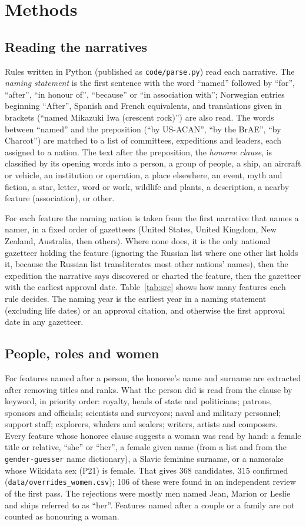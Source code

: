 \documentclass[11pt,a4paper]{article}
\begin{document}
\section{Methods}
\subsection{Reading the narratives}
Rules written in Python (published as \texttt{code/parse.py}) read each narrative. The \emph{naming statement} is the first sentence with the word ``named'' followed by ``for'', ``after'', ``in honour of'', ``because'' or ``in association with''; Norwegian entries beginning ``After'', Spanish and French equivalents, and translations given in brackets (``named Mikazuki Iwa (crescent rock)'') are also read. The words between ``named'' and the preposition (``by US-ACAN'', ``by the BrAE'', ``by Charcot'') are matched to a list of committees, expeditions and leaders, each assigned to a nation. The text after the preposition, the \emph{honoree clause}, is classified by its opening words into a person, a group of people, a ship, an aircraft or vehicle, an institution or operation, a place elsewhere, an event, myth and fiction, a star, letter, word or work, wildlife and plants, a description, a nearby feature (association), or other.

For each feature the naming nation is taken from the first narrative that names a namer, in a fixed order of gazetteers (United States, United Kingdom, New Zealand, Australia, then others). Where none does, it is the only national gazetteer holding the feature (ignoring the Russian list where one other list holds it, because the Russian list transliterates most other nations' names), then the expedition the narrative says discovered or charted the feature, then the gazetteer with the earliest approval date. Table~\ref{tab:src} shows how many features each rule decides. The naming year is the earliest year in a naming statement (excluding life dates) or an approval citation, and otherwise the first approval date in any gazetteer.

\subsection{People, roles and women}
For features named after a person, the honoree's name and surname are extracted after removing titles and ranks. What the person did is read from the clause by keyword, in priority order: royalty, heads of state and politicians; patrons, sponsors and officials; scientists and surveyors; naval and military personnel; support staff; explorers, whalers and sealers; writers, artists and composers. Every feature whose honoree clause suggests a woman was read by hand: a female title or relative, ``she'' or ``her'', a female given name (from a list and from the \texttt{gender-guesser} name dictionary), a Slavic feminine surname, or a namesake whose Wikidata sex (P21) is female. That gives 368 candidates, 315 confirmed (\texttt{data/overrides\_women.csv}); 106 of these were found in an independent review of the first pass. The rejections were mostly men named Jean, Marion or Leslie and ships referred to as ``her''. Features named after a couple or a family are not counted as honouring a woman.
\end{document}
